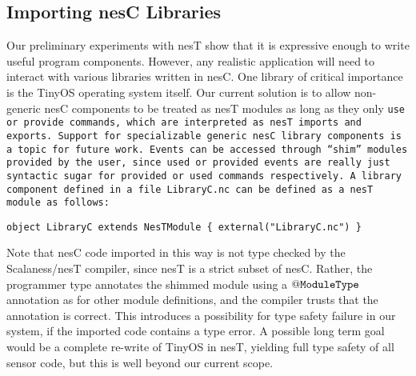 

\subsection{Importing nesC Libraries}
\label{section-libraries}

Our preliminary experiments with nesT show that it is expressive enough to write useful program
components. However, any realistic application will need to interact with various libraries
written in nesC. One library of critical importance is the TinyOS operating system itself. Our
current solution is to allow non-generic nesC components to be treated as nesT modules as long
as they only \tt{use} or \tt{provide} commands, which are interpreted as nesT imports and
exports. Support for specializable generic nesC library components is a topic for future work.
Events can be accessed through ``shim'' modules provided by the user, since used or provided
events are really just syntactic sugar for provided or used commands respectively. A library
component defined in a file \tt{LibraryC.nc} can be defined as a nesT module as follows:
\begin{Verbatim}[fontfamily=cmtt,fontsize=\scriptsize]
 object LibraryC extends NesTModule { external("LibraryC.nc") }
\end{Verbatim}
Note that nesC code imported in this way is not type checked by the Scalaness/nesT compiler,
since nesT is a strict subset of nesC. Rather, the programmer type annotates the shimmed module
using a $\tt{@ModuleType}$ annotation as for other module definitions, and the compiler trusts
that the annotation is correct. This introduces a possibility for type safety failure in our
system, if the imported code contains a type error. A possible long term goal would be a
complete re-write of TinyOS in nesT, yielding full type safety of all sensor code, but this is
well beyond our current scope.
